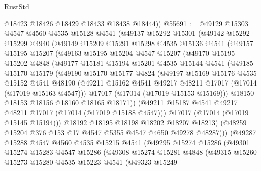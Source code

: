 \begin{lexlean}{RustStd}
\begin{coremodule}
{\begin{coremodule}
{{{{{{{{{{{{{{{{{{{{{{{{{{{{{{{{{{{{{{{{{{{{{{{{{{{{{{{        @18423
        @18426
        @18429
        @18433
        @18438
        @18444))
@55691 := @49129
    @15303
    @4547
    @4560
    @4535
    @15128
    @4541
    (@49137
      @15292
      @15301
      (@49142
        @15292
        @15299
        @4940
        (@49149
          @15209
          @15291
          @15298
          @4535
          @15136
          @4541
          (@49157
            @15195
            @15207
            (@49163
              @15195
              @15204
              @4547
              @15207
              (@49170
                @15195
                @15202
                @4848
                (@49177
                  @15181
                  @15194
                  @15201
                  @4535
                  @15144
                  @4541
                  (@49185
                    @15170
                    @15179
                    (@49190
                      @15170
                      @15177
                      @4824
                      (@49197
                        @15169
                        @15176
                        @4535
                        @15152
                        @4541
                        @48190
                        (@49211 @15162 @4541 @49217 @48211 @17017 (@17014 (@17019 @15163 @4547)))
                        @17017
                        (@17014 (@17019 @15153 @15169)))
                      @18150
                      @18153
                      @18156
                      @18160
                      @18165
                      @18171))
                  (@49211 @15187 @4541 @49217 @48211 @17017 (@17014 (@17019 @15188 @4547)))
                  @17017
                  (@17014 (@17019 @15145 @15194)))
                @18192
                @18195
                @18198
                @18202
                @18207
                @18213)
              (@48259 @15204 @376 @153 @17 @4547 @5355 @4547 @4650 @49278 @48287)))
          (@49287
            @15288
            @4547
            @4560
            @4535
            @15215
            @4541
            (@49295
              @15274
              @15286
              (@49301
                @15274
                @15283
                @4547
                @15286
                (@49308
                  @15274
                  @15281
                  @4848
                  (@49315
                    @15260
                    @15273
                    @15280
                    @4535
                    @15223
                    @4541
                    (@49323
                      @15249
}}}}}}}}}}}}}}}}}}}}}}}}}}}}}}}}}}}}}}}}}}}}}}}}}}}}}}}
\end{coremodule}}
\end{coremodule}
\end{lexlean}
